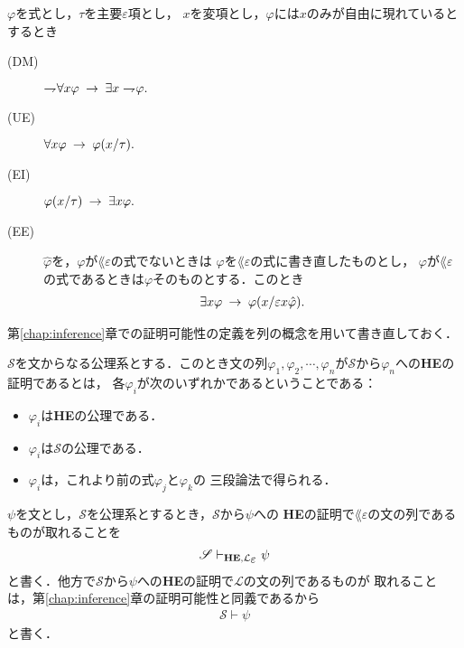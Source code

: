 	\begin{screen}
		\begin{logicalaxm}[{\bf HE}の公理(量化)]
			$\varphi$を式とし，$\tau$を主要$\varepsilon$項とし，
			$x$を変項とし，$\varphi$には$x$のみが自由に現れているとするとき
			\begin{description}
				\item[(DM)] $\rightharpoondown\hspace{-0.25em} \forall x \varphi
					\hspace{0.25em}\rightarrow\hspace{0.25em} \exists x \rightharpoondown\hspace{-0.25em} \varphi.$
				
				\item[(UE)] $\forall x \varphi \hspace{0.25em}\rightarrow\hspace{0.25em} \varphi(x/\tau).$
				
				\item[(EI)] $\varphi(x/\tau) \hspace{0.25em}\rightarrow\hspace{0.25em} \exists x \varphi.$
				
				\item[(EE)] $\hat{\varphi}$を，$\varphi$が$\lang{\varepsilon}$の式でないときは
					$\varphi$を$\lang{\varepsilon}$の式に書き直したものとし，
					$\varphi$が$\lang{\varepsilon}$の式であるときは$\varphi$そのものとする．このとき
					\begin{align}
						\exists x \varphi \hspace{0.25em}\rightarrow\hspace{0.25em} \varphi(x/\varepsilon x \hat{\varphi}).
					\end{align}
			\end{description}
		\end{logicalaxm}
	\end{screen}
	
	第\ref{chap:inference}章での証明可能性の定義を列の概念を用いて書き直しておく．
	
	\begin{screen}
		\begin{metadfn}[{\bf HE}における証明]
			$\mathscr{S}$を文からなる公理系とする．このとき文の列$\varphi_{1},\varphi_{2},\cdots,
			\varphi_{n}$が$\mathscr{S}$から$\varphi_{n}$への{\bf HE}の証明であるとは，
			各$\varphi_{i}$が次のいずれかであるということである：
			\begin{itemize}
				\item $\varphi_{i}$は{\bf HE}の公理である．
				\item $\varphi_{i}$は$\mathscr{S}$の公理である．
				\item $\varphi_{i}$は，これより前の式$\varphi_{j}$と$\varphi_{k}$の
					三段論法で得られる．
			\end{itemize}
		\end{metadfn}
	\end{screen}
	
	$\psi$を文とし，$\mathscr{S}$を公理系とするとき，$\mathscr{S}$から$\psi$への
	{\bf HE}の証明で$\lang{\varepsilon}$の文の列であるものが取れることを
	\begin{align}
		\mathscr{S} \provable{\mbox{{\bf HE}},\lang{\varepsilon}} \psi
	\end{align}
	と書く．他方で$\mathscr{S}$から$\psi$への{\bf HE}の証明で$\mathcal{L}$の文の列であるものが
	取れることは，第\ref{chap:inference}章の証明可能性と同義であるから
	\begin{align}
		\mathscr{S} \vdash \psi
	\end{align}
	と書く．
	
